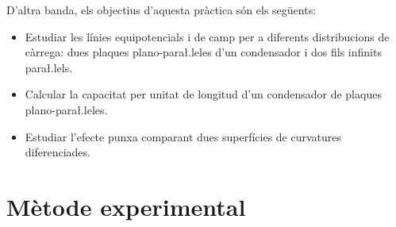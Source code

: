 D'altra banda, els objectius d'aquesta pràctica són els següents:
\begin{itemize}
	\item Estudiar les línies equipotencials i de camp per a diferents distribucions de càrrega: dues plaques plano-para\l.leles d'un condensador i dos fils infinits para\l.lels.
	\item Calcular la capacitat per unitat de longitud d'un condensador de plaques plano-para\l.leles.
	\item Estudiar l'efecte punxa comparant dues superfícies de curvatures diferenciades.
\end{itemize}
\section{Mètode experimental}

